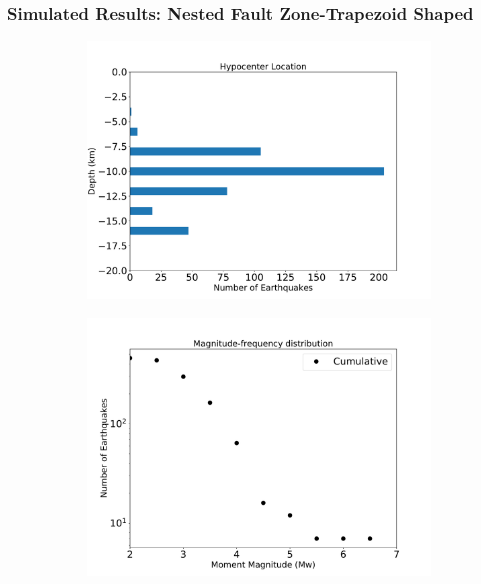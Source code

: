 \documentclass{beamer}
\begin{document}
\begin{frame}
    \frametitle{Simulated Results: Nested Fault Zone-Trapezoid Shaped}
    \begin{figure}
        \begin{subfigure}[b]{0.5\textwidth}
            \includegraphics[width=\textwidth]{images/trap.pdf} 
        \end{subfigure}%
        \begin{subfigure}[b]{0.5\textwidth}
            \includegraphics[width=\textwidth]{images/trap_mfd.pdf}
        \end{subfigure}%
    \end{figure}
\end{frame}
\end{document}
